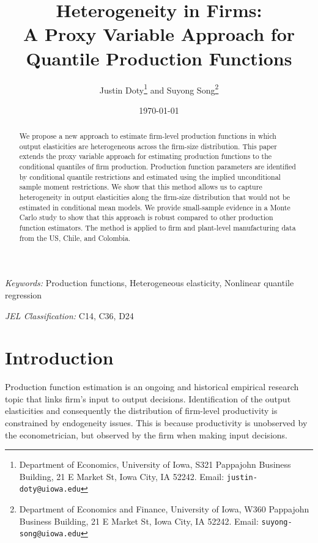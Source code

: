 \documentclass[11pt]{article}
\begin{document}
\title{Heterogeneity in Firms: \\
A Proxy Variable Approach for Quantile Production Functions
}

\author{Justin Doty\thanks{Department of Economics, University of Iowa, S321 Pappajohn Business Building, 21 E Market St, Iowa City, IA 52242. Email: \texttt{justin-doty@uiowa.edu}} and Suyong Song\thanks{Department of Economics and Finance, University of Iowa, W360 Pappajohn Business Building, 21 E Market St, Iowa City, IA 52242. Email: \texttt{suyong-song@uiowa.edu}}
}

\date {\today}
\maketitle


\begin{abstract}
We propose a new approach to estimate firm-level production functions in which output elasticities are heterogeneous across the firm-size distribution. 
This paper extends the proxy variable approach for estimating production functions to the conditional quantiles of firm production. Production function parameters are identified by conditional quantile restrictions and estimated using the implied unconditional sample moment restrictions. We show that this method allows us to capture heterogeneity in output elasticities along the firm-size distribution that would not be estimated in conditional mean models. We provide small-sample evidence in a Monte Carlo study to show that this approach is robust compared to other production function estimators. The method is applied to firm and plant-level manufacturing data from the US, Chile, and Colombia.
\end{abstract}


\textit{Keywords:} Production functions, Heterogeneous elasticity, Nonlinear quantile regression

\textit{JEL Classification:} C14, C36, D24



\baselineskip25pt

\onehalfspacing

\section{Introduction}

Production function estimation is an ongoing and historical empirical research topic that links firm's input to output decisions. Identification of the output elasticities and consequently the distribution of firm-level productivity is constrained by endogeneity issues. This is because productivity is unobserved by the econometrician, but observed by the firm when making input decisions. 
\end{document}
